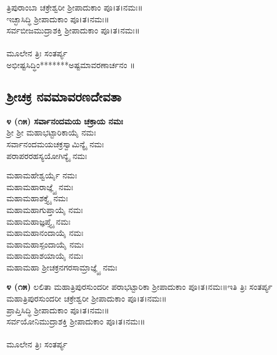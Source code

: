  ತ್ರಿಪುರಾಂಬಾ ಚಕ್ರೇಶ್ವರೀ ಶ್ರೀಪಾದುಕಾಂ ಪೂ।ತ।ನಮಃ॥\\
 ಇಚ್ಛಾಸಿದ್ಧಿ ಶ್ರೀಪಾದುಕಾಂ ಪೂ।ತ।ನಮಃ॥\\
 ಸರ್ವಬೀಜಮುದ್ರಾಶಕ್ತಿ ಶ್ರೀಪಾದುಕಾಂ ಪೂ।ತ।ನಮಃ॥\\
\\
ಮೂಲೇನ ತ್ರಿಃ ಸಂತರ್ಪ್ಯ\\
 ಅಭೀಷ್ಟಸಿದ್ಧಿಂ*******ಅಷ್ಟಮಾವರಣಾರ್ಚನಂ ॥
\subsection{ಶ್ರೀಚಕ್ರ ನವಮಾವರಣದೇವತಾ}
{\bfseries ೪ (೧೫) ಸರ್ವಾನಂದಮಯ ಚಕ್ರಾಯ ನಮಃ}\\
 ಶ್ರೀ ಶ್ರೀ ಮಹಾಭಟ್ಟಾರಿಕಾಯೈ ನಮಃ\\
 ಸರ್ವಾನಂದಮಯಚಕ್ರಸ್ವಾಮಿನ್ಯೈ ನಮಃ\\
ಪರಾಪರರಹಸ್ಯಯೋಗಿನ್ಯೈ ನಮಃ


 ಮಹಾಮಹೇಶ್ವರ್ಯೈ ನಮಃ\\
 ಮಹಾಮಹಾರಾಜ್ಞ್ಯೈ ನಮಃ\\
 ಮಹಾಮಹಾಶಕ್ತ್ಯೈ ನಮಃ\\
 ಮಹಾಮಹಾಗುಪ್ತಾಯೈ ನಮಃ\\
 ಮಹಾಮಹಾಜ್ಞಪ್ತ್ಯೈ ನಮಃ\\
 ಮಹಾಮಹಾನಂದಾಯೈ ನಮಃ\\
 ಮಹಾಮಹಾಸ್ಪಂದಾಯೈ ನಮಃ\\
 ಮಹಾಮಹಾಶಯಾಯೈ ನಮಃ\\
 ಮಹಾಮಹಾ ಶ್ರೀಚಕ್ರನಗರಸಾಮ್ರಾಜ್ಞ್ಯೈ ನಮಃ

{\bfseries ೪ (೧೫)} ಲಲಿತಾ ಮಹಾತ್ರಿಪುರಸುಂದರೀ ಪರಾಭಟ್ಟಾರಿಕಾ ಶ್ರೀಪಾದುಕಾಂ ಪೂ।ತ।ನಮಃ॥ಇತಿ ತ್ರಿಃ ಸಂತರ್ಪ್ಯ\\
ಮಹಾತ್ರಿಪುರಸುಂದರೀ ಚಕ್ರೇಶ್ವರೀ ಶ್ರೀಪಾದುಕಾಂ ಪೂ।ತ।ನಮಃ॥\\
 ಪ್ರಾಪ್ತಿಸಿದ್ಧಿ ಶ್ರೀಪಾದುಕಾಂ ಪೂ।ತ।ನಮಃ॥\\
 ಸರ್ವಯೋನಿಮುದ್ರಾಶಕ್ತಿ ಶ್ರೀಪಾದುಕಾಂ ಪೂ।ತ।ನಮಃ॥\\
\\
ಮೂಲೇನ ತ್ರಿಃ ಸಂತರ್ಪ್ಯ

